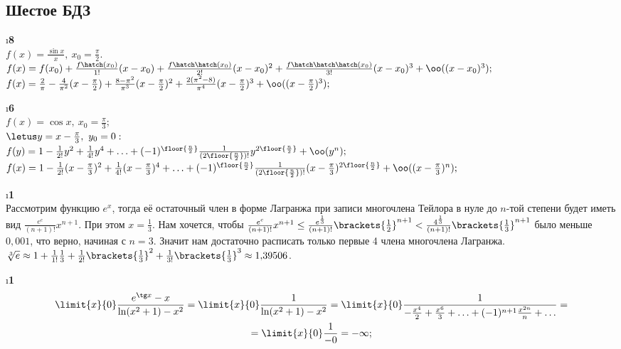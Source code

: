 \subsection{Шестое БДЗ}

\i\textbf{8}\\
$f(x) = \frac{\sin x}{x},\ x_0 = \frac{\pi}{2}$.\\
$f(x) = f(x_0) + \frac{f\hatch(x_0)}{1!}(x-x_0) + \frac{f\hatch\hatch(x_0)}{2!}(x-x_0)^2 + \frac{f\hatch\hatch\hatch(x_0)}{3!}(x-x_0)^3 + \oo((x-x_0)^3);$\\
$f(x) = \frac{2}{\pi} - \frac{4}{\pi^2}(x-\frac{\pi}{2}) + \frac{8-\pi^2}{\pi^3}(x-\frac{\pi}{2})^2 + \frac{2(\pi^2-8)}{\pi^4}(x-\frac{\pi}{2})^3 + \oo((x-\frac{\pi}{2})^3);$

\i\textbf{6}\\
$f(x) = \cos x,\ x_0 = \frac{\pi}{3};$\\
$\letus y = x - \frac{\pi}{3},\ y_0 = 0:$\\
$f(y) = 1 - \frac{1}{2!}y^2 + \frac{1}{4!}y^4 + \ldots + (-1)^{\floor{\frac{n}{2}}}\frac{1}{(2\floor{\frac{n}{2}})!}y^{2\floor{\frac{n}{2}}} + \oo(y^n);$\\
$f(x) = 1 - \frac{1}{2!}(x-\frac{\pi}{3})^2 + \frac{1}{4!}(x-\frac{\pi}{3})^4 + \ldots + (-1)^{\floor{\frac{n}{2}}}\frac{1}{(2\floor{\frac{n}{2}})!}(x-\frac{\pi}{3})^{2\floor{\frac{n}{2}}} + \oo((x-\frac{\pi}{3})^n);$


\i\textbf{1}\\
Рассмотрим функцию $e^x$, тогда её остаточный член в форме Лагранжа при записи многочлена Тейлора в нуле до $n$-той степени будет иметь вид $\frac{e^c}{(n+1)!}x^{n+1}$. При этом $x = \frac{1}{3}$. Нам хочется, чтобы $\frac{e^c}{(n+1)!}x^{n+1} \leq \frac{e^{\frac{1}{3}}}{(n+1)!}\brackets{\frac{1}{2}}^{n+1} < \frac{4^{\frac{1}{3}}}{(n+1)!}\brackets{\frac{1}{3}}^{n+1}$ было меньше $0{,}001$, что верно, начиная с $n=3$. Значит нам достаточно расписать только первые 4 члена многочлена Лагранжа.\\
$\sqrt[3]{e} \approx 1 + \frac{1}{1!}\frac{1}{3} + \frac{1}{2!}\brackets{\frac{1}{3}}^2 + \frac{1}{3!}\brackets{\frac{1}{3}}^3 \approx 1{,}39506$.

\i\textbf{1}\\
\begin{gather*}
    \limit{x}{0}\frac{e^{\tg x}-x}{\ln(x^2+1)-x^2} = \limit{x}{0} \frac{1}{\ln(x^2+1)-x^2} = \limit{x}{0} \frac{1}{-\frac{x^4}{2} + \frac{x^6}{3} + \ldots + (-1)^{n+1}\frac{x^{2n}}{n} + \ldots} = \\
    = \limit{x}{0}\frac{1}{-0} = -\infty;
\end{gather*}

